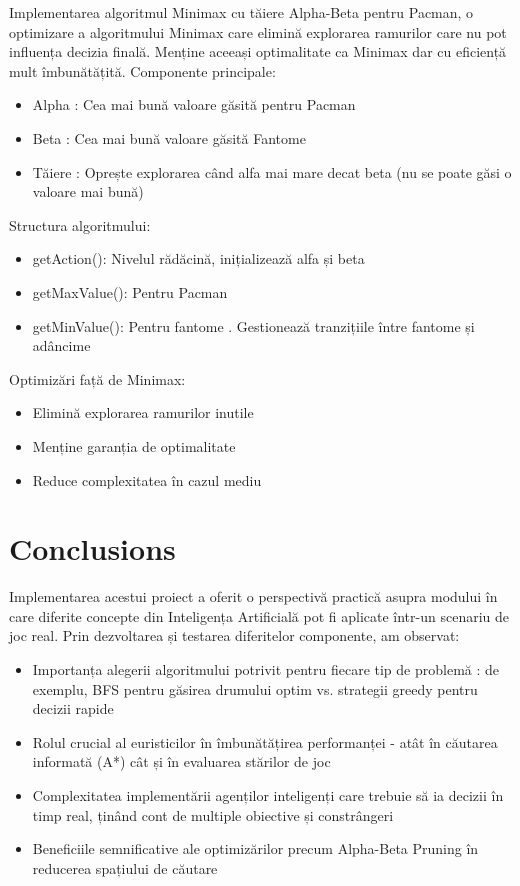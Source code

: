 \documentclass[12pt,a4paper]{article}
\begin{document}
Implementarea algoritmul Minimax cu tăiere Alpha-Beta pentru Pacman, o optimizare a algoritmului Minimax care elimină explorarea ramurilor care nu pot influența decizia finală. Menține aceeași optimalitate ca Minimax dar cu eficiență mult îmbunătățită.
Componente principale:
\begin{itemize}
    \item  Alpha : Cea mai bună valoare găsită pentru Pacman
    \item  Beta : Cea mai bună valoare găsită Fantome
    \item  Tăiere : Oprește explorarea când alfa mai mare decat beta (nu se poate găsi o valoare mai bună) \newline
\end{itemize}

Structura algoritmului:
\begin{itemize}
    \item  getAction(): Nivelul rădăcină, inițializează alfa și beta
    \item getMaxValue(): Pentru Pacman
    \item getMinValue(): Pentru fantome . Gestionează tranzițiile între fantome și adâncime \newline
\end{itemize}

Optimizări față de Minimax:
\begin{itemize}
    \item  Elimină explorarea ramurilor inutile
    \item  Menține garanția de optimalitate
   \item   Reduce complexitatea în cazul mediu \newline
\end{itemize}



\section{Conclusions}
Implementarea acestui proiect a oferit o perspectivă practică asupra modului în care diferite concepte din Inteligența Artificială pot fi aplicate într-un scenariu de joc real. Prin dezvoltarea și testarea diferitelor componente, am observat:

\begin{itemize}
    \item Importanța alegerii algoritmului potrivit pentru fiecare tip de problemă : de exemplu, BFS pentru găsirea drumului optim vs. strategii greedy pentru decizii rapide
    \item Rolul crucial al euristicilor în îmbunătățirea performanței - atât în căutarea informată (A*) cât și în evaluarea stărilor de joc
    \item Complexitatea implementării agenților inteligenți care trebuie să ia decizii în timp real, ținând cont de multiple obiective și constrângeri
    \item Beneficiile semnificative ale optimizărilor precum Alpha-Beta Pruning în reducerea spațiului de căutare
\end{itemize}
\end{document}
